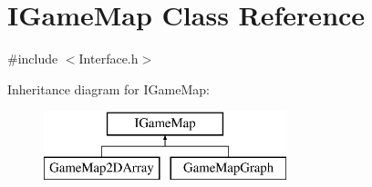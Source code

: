 \hypertarget{class_i_game_map}{}\section{I\+Game\+Map Class Reference}
\label{class_i_game_map}


{\ttfamily \#include $<$Interface.\+h$>$}

Inheritance diagram for I\+Game\+Map\+:\begin{figure}[H]
\begin{center}
\leavevmode
\includegraphics[height=2.000000cm]{class_i_game_map}
\end{center}
\end{figure}
